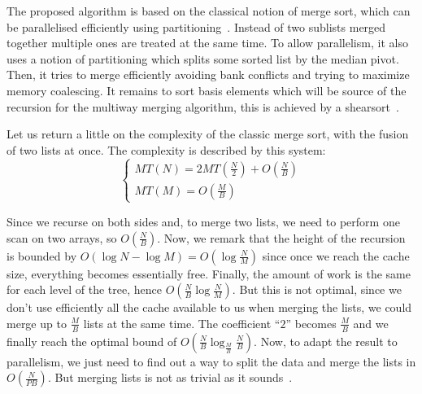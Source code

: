 The proposed algorithm is based on the classical notion of merge sort, which can be parallelised efficiently using partitioning~\cite{satish2009designing}. Instead of two sublists merged together multiple ones are treated at the same time. To allow parallelism, it also uses a notion of partitioning which splits some sorted list by the median pivot. Then, it tries to merge efficiently avoiding bank conflicts and trying to maximize memory coalescing. It remains to sort basis elements which will be source of the recursion for the multiway merging algorithm, this is achieved by a shearsort~\cite{sitchinava2013provably}.

Let us return a little on the complexity of the classic merge sort, with the fusion of two lists at once. The complexity is described by this system:
$$
\left\{
    \begin{array}{ll}
        MT(N) = 2MT(\frac{N}{2}) + O(\frac{N}{B}) \\
        MT(M) = O(\frac{M}{B})
    \end{array}
\right.
$$

Since we recurse on both sides and, to merge two lists, we need to perform one scan on two arrays, so $O(\frac{N}{B})$. Now, we remark that the height of the recursion is bounded by $O(\log N - \log M) = O(\log \frac{N}{M})$ since once we reach the cache size, everything becomes essentially free. Finally, the amount of work is the same for each level of the tree, hence $O(\frac{N}{B} \log \frac{N}{M})$. But this is not optimal, since we don't use efficiently all the cache available to us when merging the lists, we could merge up to $\frac{M}{B}$ lists at the same time. The coefficient ``$2$'' becomes $\frac{M}{B}$ and we finally reach the optimal bound of $O(\frac{N}{B} \log_{\frac{M}{B}} \frac{N}{B})$. Now, to adapt the result to parallelism, we just need to find out a way to split the data and merge the lists in $O(\frac{N}{PB})$. But merging lists is not as trivial as it sounds~\cite{green2012gpu}.